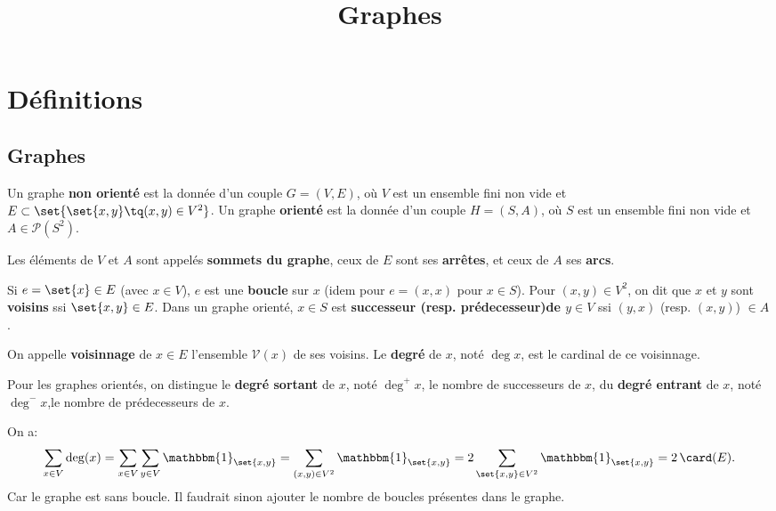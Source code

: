 \documentclass{scrartcl}
\title{Graphes}
\author{}
\date{}
\begin{document}
	\maketitle
	\section{Définitions}
		\subsection{Graphes}
			 Un graphe \textbf{non orienté} est la donnée 
			d'un couple $G = (V,E)$,
			où $V$ est un ensemble fini non vide 
			et $E \subset \set{\set{x,y} \tq (x,y) \in V^2}$.
			Un graphe \textbf{orienté} est la donnée d'un couple $H = (S,A)$,
			où $S$ est un ensemble fini non vide et 
			$A \in \mathcal{P}(S^2)$.

			Les éléments de $V$ et $A$ sont appelés \textbf{sommets du graphe}, 
			ceux de $E$ sont ses \textbf{arrêtes}, et ceux de $A$ ses \textbf{arcs}.

			Si $e = \set{x} \in E$ (avec $x \in V$), $e$ est une \textbf{boucle} sur $x$
			(idem pour $e = (x,x)$ pour $x \in S$). 
			Pour $(x,y) \in V^2$, on dit que $x$ et $y$ sont \textbf{voisins} ssi $\set{x,y} \in E$.
			Dans un graphe orienté, $x \in S$ est \textbf{successeur (resp. prédecesseur)de $y \in V$} ssi $(y,x)$ (resp. $(x,y)$) $\in A$.

			On appelle \textbf{voisinnage} de $x \in E$ l'ensemble $\mathscr{V}(x)$ de ses voisins.
			Le \textbf{degré} de $x$, noté $\deg x$, est le cardinal de ce voisinnage.

			Pour les graphes orientés, on distingue le \textbf{degré sortant} de $x$, noté $\deg^+ x$, le nombre de successeurs de $x$,
			du \textbf{degré entrant} de $x$, noté $\deg^- x$,le nombre de prédecesseurs de $x$.


			\begin{demo}
				\item On a:
				\[
					\sum_{x \in V} \deg(x)= \sum_{x\in V} \sum_{y\in V} \mathbbm{1}_\set{x,y} = \sum_{(x,y) \in V^2} \mathbbm{1}_\set{x,y}
					= 2\sum_{\set{x,y} \in V^2} \mathbbm{1}_\set{x,y} = 2\,\card(E).
				\]
				Car le graphe est sans boucle. Il faudrait sinon ajouter le nombre de boucles présentes dans le graphe.
			\end{demo}
\end{document}
